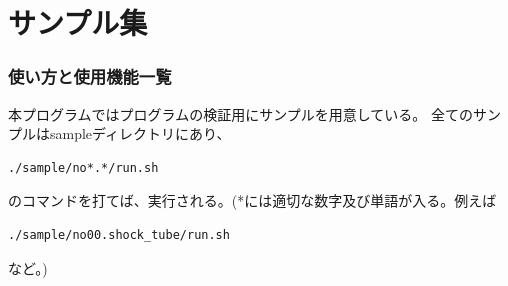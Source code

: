 \documentclass{jsarticle}
\begin{document}
%
%
%
%
%
%
%
%
\part{サンプル集}
\newpage
\section{使い方と使用機能一覧}%
本プログラムではプログラムの検証用にサンプルを用意している。
全てのサンプルはsampleディレクトリにあり、
\begin{verbatim}
./sample/no*.*/run.sh
\end{verbatim}
のコマンドを打てば、実行される。(*には適切な数字及び単語が入る。例えば
\begin{verbatim}
./sample/no00.shock_tube/run.sh
\end{verbatim}
など。)
\end{document}
